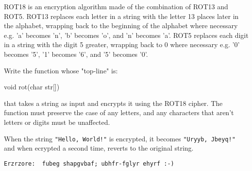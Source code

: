 


ROT18 is an encryption algorithm made of the combination of ROT13 and
ROT5. ROT13 replaces each letter in a string with the letter 13 places
later in the alphabet, wrapping back to the beginning of the alphabet
where necessary e.g. 'a' becomes 'n', 'b' becomes 'o', and 'n' becomes
'a'. ROT5 replaces each digit in a string with the digit 5 greater,
wrapping back to 0 where necessary e.g. '0' becomes '5', '1' becomes
'6', and '5' becomes '0'.


\begin{exercise}

Write the function whose "top-line" is:
\begin{codesnippet}
void rot(char str[])
\end{codesnippet}

\noindent that takes a string as input and encrypts it using the ROT18
cipher. The function must preserve the case of any letters, and any
characters that aren't letters or digits must be unaffected.

When the string \verb^"Hello, World!"^ is encrypted, it becomes
\verb^"Uryyb, Jbeyq!"^ and when ecrypted a second time, reverts to the
original string.


\begin{verbatim}
Erzrzore:  fubeg shapgvbaf; ubhfr-fglyr ehyrf :-)
\end{verbatim}

\end{exercise}

